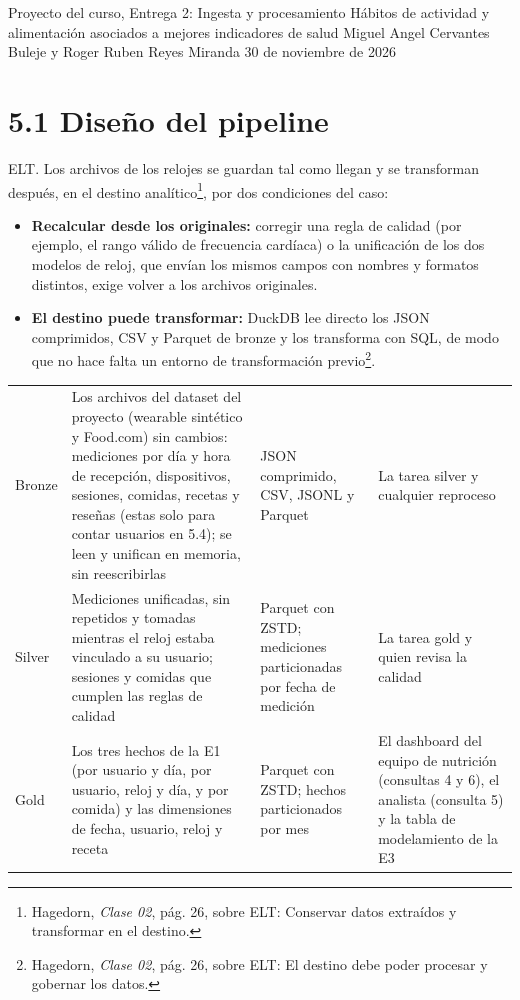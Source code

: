 \documentclass[11pt]{article}
\begin{document}
{Proyecto del curso, Entrega 2: Ingesta y procesamiento}
{Hábitos de actividad y alimentación asociados a mejores indicadores de salud}
{Miguel Angel Cervantes Buleje y Roger Ruben Reyes Miranda}
{30 de noviembre de 2026}

\begingroup\color{vinotinto}
\section{5.1 Diseño del pipeline}

 ELT. Los archivos de los relojes se guardan tal como
llegan y se transforman después, en el destino analítico\footnote{Hagedorn,
\emph{Clase 02}, pág. 26, sobre ELT: \textquotedbl{}Conservar datos extraídos y
transformar en el destino\textquotedbl{}.}, por dos condiciones del caso:
\begin{itemize}
  \item \textbf{Recalcular desde los originales:} corregir una regla de
  calidad (por ejemplo, el rango válido de frecuencia cardíaca) o la
  unificación de los dos modelos de reloj, que envían los mismos campos con
  nombres y formatos distintos, exige volver a los archivos originales.
  \item \textbf{El destino puede transformar:} DuckDB lee directo los JSON
  comprimidos, CSV y Parquet de bronze y los transforma con SQL, de modo que
  no hace falta un entorno de transformación previo\footnote{Hagedorn,
  \emph{Clase 02}, pág. 26, sobre ELT: \textquotedbl{}El destino debe poder
  procesar y gobernar los datos\textquotedbl{}.}.
\end{itemize}


\begingroup\iniciartabla\small
\begin{tabularx}{\textwidth}{|L{1.5cm}|Y|L{3.4cm}|L{3.6cm}|}\hline
{} &  &  &
\\\hline
Bronze & Los archivos del dataset del proyecto (wearable sintético y Food.com) sin cambios: mediciones por día y hora de
recepción, dispositivos, sesiones, comidas, recetas y reseñas (estas solo
para contar usuarios en 5.4); se leen y unifican en memoria, sin reescribirlas & JSON comprimido, CSV,
JSONL y Parquet & La tarea silver y cualquier reproceso\\\hline
Silver & Mediciones unificadas, sin repetidos y tomadas mientras el reloj
estaba vinculado a su usuario;
sesiones y comidas que cumplen las reglas de calidad & Parquet con ZSTD;
mediciones particionadas por fecha de medición & La tarea gold y quien revisa
la calidad\\\hline
Gold & Los tres hechos de la E1 (por usuario y día, por usuario, reloj y día,
y por comida) y las dimensiones de fecha, usuario, reloj y receta & Parquet con ZSTD; hechos particionados por
mes & El dashboard del equipo de nutrición (consultas 4 y 6), el analista
(consulta 5) y la tabla de modelamiento de la E3\\\hline
\end{tabularx}
\endgroup
\end{document}
